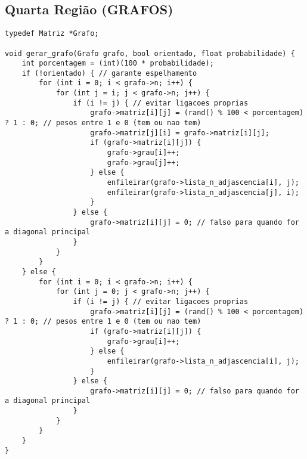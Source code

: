 \documentclass[12pt, openright, oneside, a4paper, chapter=TITLE, section=TITLE, subsection=TITLE, subsubsection=TITLE, brazil]{abntex2}
\newenvironment{codebox}%
  {\begin{mdframed}[backgroundcolor=gray!5, linecolor=gray, roundcorner=5pt]}%
  {\end{mdframed}}
\begin{document}
\subsection{Quarta Região (GRAFOS)}
\begin{codebox}
\begin{verbatim}
typedef Matriz *Grafo;

void gerar_grafo(Grafo grafo, bool orientado, float probabilidade) {
    int porcentagem = (int)(100 * probabilidade);
    if (!orientado) { // garante espelhamento
        for (int i = 0; i < grafo->n; i++) {
            for (int j = i; j < grafo->n; j++) {
                if (i != j) { // evitar ligacoes proprias
                    grafo->matriz[i][j] = (rand() % 100 < porcentagem) ? 1 : 0; // pesos entre 1 e 0 (tem ou nao tem)
                    grafo->matriz[j][i] = grafo->matriz[i][j];
                    if (grafo->matriz[i][j]) {
                        grafo->grau[i]++;
                        grafo->grau[j]++;
                    } else {
                        enfileirar(grafo->lista_n_adjascencia[i], j);
                        enfileirar(grafo->lista_n_adjascencia[j], i);
                    }
                } else {
                    grafo->matriz[i][j] = 0; // falso para quando for a diagonal principal
                }
            }
        }
    } else {
        for (int i = 0; i < grafo->n; i++) {
            for (int j = 0; j < grafo->n; j++) {
                if (i != j) { // evitar ligacoes proprias
                    grafo->matriz[i][j] = (rand() % 100 < porcentagem) ? 1 : 0; // pesos entre 1 e 0 (tem ou nao tem)
                    if (grafo->matriz[i][j]) {
                        grafo->grau[i]++;
                    } else {
                        enfileirar(grafo->lista_n_adjascencia[i], j);
                    }
                } else {
                    grafo->matriz[i][j] = 0; // falso para quando for a diagonal principal
                }
            }
        }
    }
}


\end{verbatim}
\end{codebox}
\end{document}
